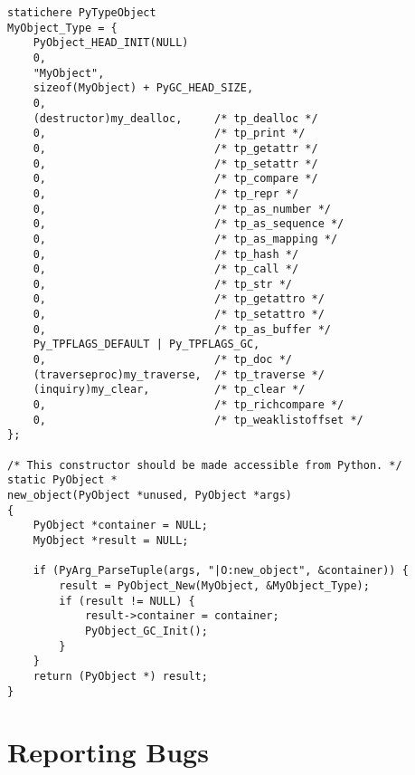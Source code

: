 \documentclass{manual}
\begin{document}
\begin{verbatim}
statichere PyTypeObject
MyObject_Type = {
    PyObject_HEAD_INIT(NULL)
    0,
    "MyObject",
    sizeof(MyObject) + PyGC_HEAD_SIZE,
    0,
    (destructor)my_dealloc,     /* tp_dealloc */
    0,                          /* tp_print */
    0,                          /* tp_getattr */
    0,                          /* tp_setattr */
    0,                          /* tp_compare */
    0,                          /* tp_repr */
    0,                          /* tp_as_number */
    0,                          /* tp_as_sequence */
    0,                          /* tp_as_mapping */
    0,                          /* tp_hash */
    0,                          /* tp_call */
    0,                          /* tp_str */
    0,                          /* tp_getattro */
    0,                          /* tp_setattro */
    0,                          /* tp_as_buffer */
    Py_TPFLAGS_DEFAULT | Py_TPFLAGS_GC,
    0,                          /* tp_doc */
    (traverseproc)my_traverse,  /* tp_traverse */
    (inquiry)my_clear,          /* tp_clear */
    0,                          /* tp_richcompare */
    0,                          /* tp_weaklistoffset */
};

/* This constructor should be made accessible from Python. */
static PyObject *
new_object(PyObject *unused, PyObject *args)
{
    PyObject *container = NULL;
    MyObject *result = NULL;

    if (PyArg_ParseTuple(args, "|O:new_object", &container)) {
        result = PyObject_New(MyObject, &MyObject_Type);
        if (result != NULL) {
            result->container = container;
            PyObject_GC_Init();
        }
    }
    return (PyObject *) result;
}
\end{verbatim}


%


\appendix
\chapter{Reporting Bugs}


\end{document}
